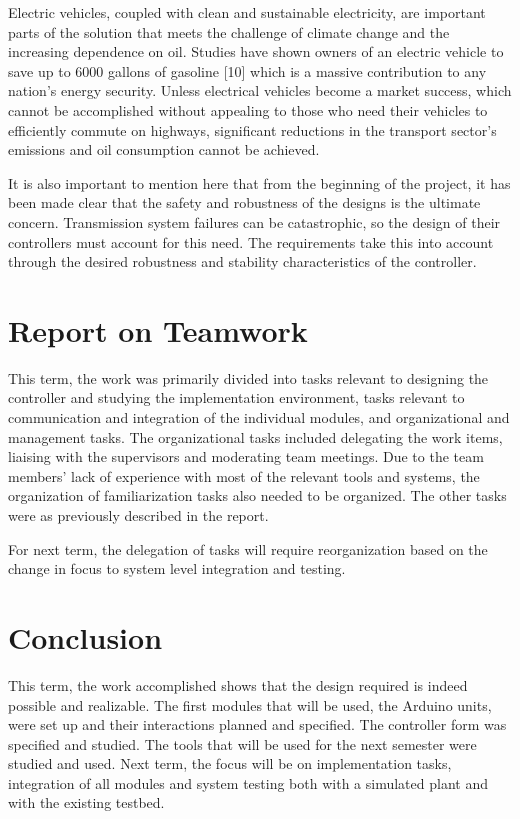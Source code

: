 \documentclass{article}
\begin{document}
\begin{flushleft}
Electric vehicles, coupled with clean and sustainable electricity, are important parts of the solution that meets the challenge of climate change and the increasing dependence on oil. Studies have shown owners of an electric vehicle to save up to 6000 gallons of gasoline [10] which is a massive contribution to any nation’s energy security. Unless electrical vehicles become a market success, which cannot be accomplished without appealing to those who need their vehicles to efficiently commute on highways, significant reductions in the transport sector’s emissions and oil consumption cannot be achieved. 
\end{flushleft}

\begin{flushleft}
It is also important to mention here that from the beginning of the project, it has been made clear that the safety and robustness of the designs is the ultimate concern. Transmission system failures can be catastrophic, so the design of their controllers must account for this need. The requirements take this into account through the desired robustness and stability characteristics of the controller. 
\end{flushleft}

\section{Report on Teamwork}
\begin{flushleft}
This term, the work was primarily divided into tasks relevant to designing the controller and studying the implementation environment, tasks relevant to communication and integration of the individual modules, and organizational and management tasks. The organizational tasks included delegating the work items, liaising with the supervisors and moderating team meetings. Due to the team members’ lack of experience with most of the relevant tools and systems, the organization of familiarization tasks also needed to be organized. The other tasks were as previously described in the report.
\end{flushleft}

\begin{flushleft}
For next term, the delegation of tasks will require reorganization based on the change in focus to system level integration and testing. 
\end{flushleft}

\section{Conclusion}
\begin{flushleft}
This term, the work accomplished shows that the design required is indeed possible and realizable. The first modules that will be used, the Arduino units, were set up and their interactions planned and specified. The controller form was specified and studied. The tools that will be used for the next semester were studied and used. Next term, the focus will be on implementation tasks, integration of all modules and system testing both with a simulated plant and with the existing testbed. 
\end{flushleft}
\end{document}
